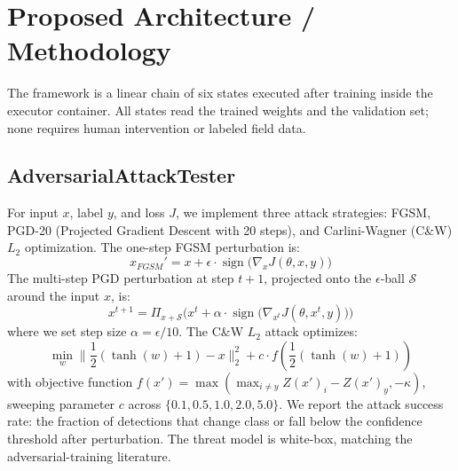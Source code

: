 \documentclass[10pt,twocolumn,letterpaper]{article}
\begin{document}
\section{Proposed Architecture / Methodology}
\label{sec:arch}
The framework is a linear chain of six states executed after training inside the executor container. All states read the trained weights and the validation set; none requires human intervention or labeled field data.

\subsection{AdversarialAttackTester}
For input $x$, label $y$, and loss $J$, we implement three attack strategies: FGSM, PGD-20 (Projected Gradient Descent with 20 steps), and Carlini-Wagner (C\&W) $L_2$ optimization.
The one-step FGSM perturbation is:
\begin{equation}
    x_{FGSM}' = x + \epsilon \cdot \operatorname{sign}\big(\nabla_x J(\theta, x, y)\big)
\end{equation}
The multi-step PGD perturbation at step $t+1$, projected onto the $\epsilon$-ball $\mathcal{S}$ around the input $x$, is:
\begin{equation}
    x^{t+1} = \Pi_{x+\mathcal{S}} \Big( x^t + \alpha \cdot \operatorname{sign}\big(\nabla_{x^t} J(\theta, x^t, y)\big) \Big)
\end{equation}
where we set step size $\alpha = \epsilon / 10$. The C\&W $L_2$ attack optimizes:
\begin{equation}
    \min_{w} \| \frac{1}{2}(\tanh(w)+1) - x \|_2^2 + c \cdot f(\frac{1}{2}(\tanh(w)+1))
\end{equation}
with objective function $f(x') = \max(\max_{i \neq y} Z(x')_i - Z(x')_y, -\kappa)$, sweeping parameter $c$ across $\{0.1, 0.5, 1.0, 2.0, 5.0\}$.
We report the attack success rate: the fraction of detections that change class or fall below the confidence threshold after perturbation. The threat model is white-box, matching the adversarial-training literature.
\end{document}
